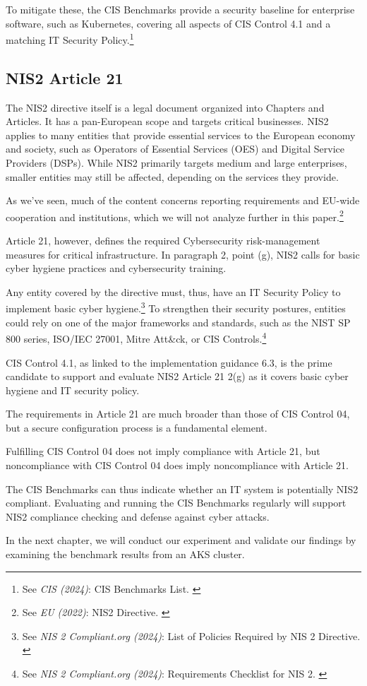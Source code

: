 To mitigate these, the CIS Benchmarks provide a security baseline for enterprise software, such as Kubernetes, covering all aspects of CIS Control 4.1 and a matching IT Security Policy.\footnote{See \textit{CIS (2024)}: CIS Benchmarks List. \cite{cisBenchmarks}}

\subsection{NIS2 Article 21}

The NIS2 directive itself is a legal document organized into Chapters and Articles. It has a pan-European scope and targets critical businesses. NIS2 applies to many entities that provide essential services to the European economy and society, such as Operators of Essential Services (OES) and Digital Service Providers (DSPs). While NIS2 primarily targets medium and large enterprises, smaller entities may still be affected, depending on the services they provide.

As we've seen, much of the content concerns reporting requirements and EU-wide cooperation and institutions, which we will not analyze further in this paper.\footnote{See \textit{EU (2022)}: NIS2 Directive. \cite{nis2}}

Article 21, however, defines the required Cybersecurity risk-management measures for critical infrastructure. In paragraph 2, point (g), NIS2 calls for basic cyber hygiene practices and cybersecurity training.

Any entity covered by the directive must, thus, have an IT Security Policy to implement basic cyber hygiene.\footnote{See \textit{NIS 2 Compliant.org (2024)}: List of Policies Required by NIS 2 Directive. \cite{nisPols}} To strengthen their security postures, entities could rely on one of the major frameworks and standards, such as the NIST SP 800 series, ISO/IEC 27001, Mitre Att\&ck, or CIS Controls.\footnote{See \textit{NIS 2 Compliant.org (2024)}: Requirements Checklist for NIS 2. \cite{nisReqs}}

CIS Control 4.1, as linked to the implementation guidance 6.3, is the prime candidate to support and evaluate NIS2 Article 21 2(g) as it covers basic cyber hygiene and IT security policy.

The requirements in Article 21 are much broader than those of CIS Control 04, but a secure configuration process is a fundamental element.

Fulfilling CIS Control 04 does not imply compliance with Article 21, but noncompliance with CIS Control 04 does imply noncompliance with Article 21.

The CIS Benchmarks can thus indicate whether an IT system is potentially NIS2 compliant. Evaluating and running the CIS Benchmarks regularly will support NIS2 compliance checking and defense against cyber attacks.

In the next chapter, we will conduct our experiment and validate our findings by examining the benchmark results from an AKS cluster.
